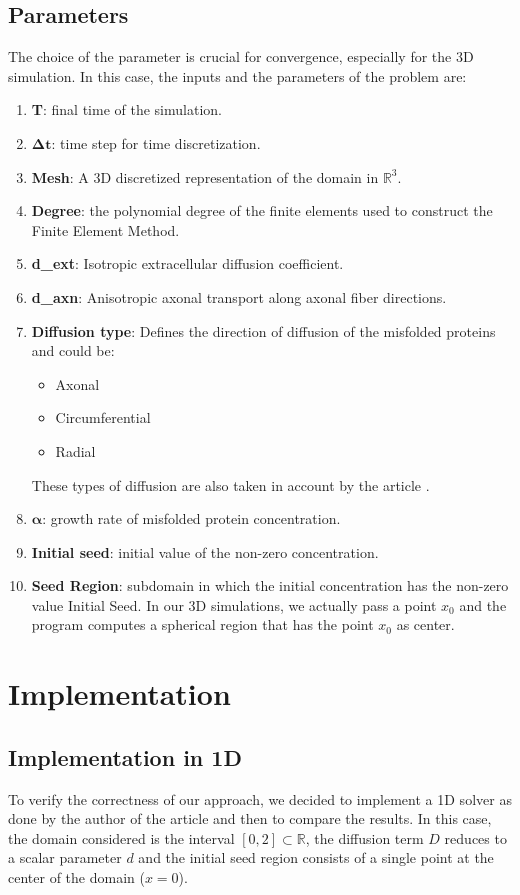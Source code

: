 \documentclass[12pt, a4paper, twoside, openright]{report}
\begin{document}
\subsection{Parameters}\label{parameters}
The choice of the parameter is crucial for convergence, especially for the 3D simulation. In this case, the inputs and the parameters of the problem are:
\begin{enumerate}
    \item \textbf{T}: final time of the simulation.
    \item \textbf{\(\boldsymbol{\Delta t}\)}: time step for time discretization.
    \item \textbf{Mesh}: A 3D discretized representation of the domain in \(\mathbb{R}^3\).
    \item \textbf{Degree}: the polynomial degree of the finite elements used to construct the Finite Element Method.
    \item \textbf{d\_ext}: Isotropic extracellular diffusion coefficient.
    \item \textbf{d\_axn}: Anisotropic axonal transport along axonal fiber directions.
    \item \textbf{Diffusion type}: Defines the direction of diffusion of the misfolded proteins and could be:
        \begin{itemize}
            \item Axonal
            \item Circumferential
            \item Radial
        \end{itemize}
    These types of diffusion are also taken in account by the article \cite{WEICKENMEIER2019264}.
    \item \textbf{\(\boldsymbol{\alpha}\)}: growth rate of misfolded protein concentration.
    \item \textbf{Initial seed}: initial value of the non-zero concentration.
    \item \textbf{Seed Region}: subdomain in which the initial concentration has the non-zero value Initial Seed. In our 3D simulations, we actually pass a point $x_0$ and the program computes a spherical region that has the point $x_0$ as center.
\end{enumerate}
\section{Implementation}
\subsection{Implementation in 1D}
To verify the correctness of our approach, we decided to implement a 1D solver as done by the author of the article \cite{WEICKENMEIER2019264} and then to compare the results. In this case, the domain considered is the interval \([0,2] \subset \mathbb{R}\), the diffusion term \( D \) reduces to a scalar parameter \( d \) and the initial seed region consists of a single point at the center of the domain (\( x = 0 \)).
\end{document}
